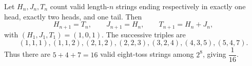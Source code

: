 Let $H_n,J_n,T_n$ count valid length-$n$ strings ending respectively in exactly one head, exactly two heads, and one tail. Then
\[H_{n+1}=T_n,\qquad J_{n+1}=H_n,\qquad T_{n+1}=H_n+J_n,\]
with $(H_1,J_1,T_1)=(1,0,1)$. The successive triples are
\[(1,1,1),(1,1,2),(2,1,2),(2,2,3),(3,2,4),(4,3,5),(5,4,7).\]
Thus there are $5+4+7=16$ valid eight-toss strings among $2^8$, giving $\boxed{\dfrac{1}{16}}$.
